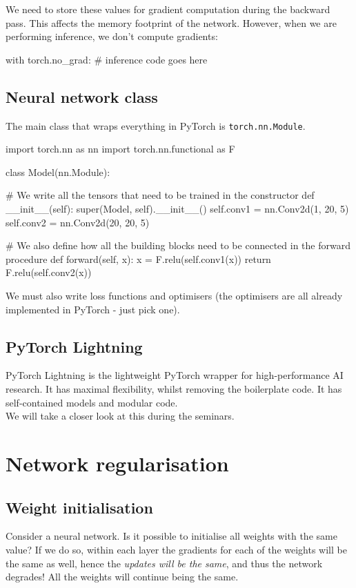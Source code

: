 We need to store these values for gradient computation during the backward pass. This affects the memory footprint of the network. However, when we are performing inference, we don't compute gradients:
\begin{python}
with torch.no_grad:
	# inference code goes here
\end{python}

\minirule

\subsection{Neural network class}
The main class that wraps everything in PyTorch is \texttt{torch.nn.Module}.
\begin{python}
import torch.nn as nn
import torch.nn.functional as F

class Model(nn.Module):

	# We write all the tensors that need to be trained in the constructor
	def __init__(self):
		super(Model, self).__init__()
		self.conv1 = nn.Conv2d(1, 20, 5)
		self.conv2 = nn.Conv2d(20, 20, 5)
	
	# We also define how all the building blocks need to be connected in the forward procedure
	def forward(self, x):
		x = F.relu(self.conv1(x))
		return F.relu(self.conv2(x))
\end{python}

We must also write loss functions and optimisers (the optimisers are all already implemented in PyTorch - just pick one). 

\minirule

\subsection{PyTorch Lightning}
PyTorch Lightning is the lightweight PyTorch wrapper for high-performance AI research. It has maximal flexibility, whilst removing the boilerplate code. It has self-contained models and modular code.\\

We will take a closer look at this during the seminars.








\newpage
\section{Network regularisation}


\subsection{Weight initialisation}
Consider a neural network. Is it possible to initialise all weights with the same value? If we do so, within each layer the gradients for each of the weights will be the same as well, hence the \textit{updates will be the same}, and thus the network degrades! All the weights will continue being the same.\\

